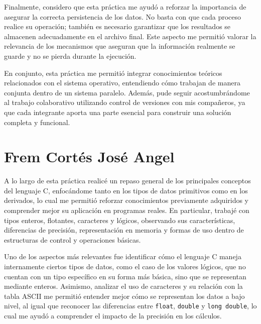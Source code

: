 Finalmente, considero que esta práctica me ayudó a reforzar la importancia de asegurar la correcta persistencia de los datos. No basta con que cada proceso realice su operación; también es necesario garantizar que los resultados se almacenen adecuadamente en el archivo final. Este aspecto me permitió valorar la relevancia de los mecanismos que aseguran que la información realmente se guarde y no se pierda durante la ejecución.

En conjunto, esta práctica me permitió integrar conocimientos teóricos relacionados con el sistema operativo, entendiendo cómo trabajan de manera conjunta dentro de un sistema paralelo. Además, pude seguir acostumbrándome al trabajo colaborativo utilizando control de versiones con mis compañeros, ya que cada integrante aporta una parte esencial para construir una solución completa y funcional.

\newpage
\section{Frem Cortés José Angel}

A lo largo de esta práctica realicé un repaso general de los principales conceptos del lenguaje C, enfocándome tanto en los tipos de datos primitivos como en los derivados, lo cual me permitió reforzar conocimientos previamente adquiridos y comprender mejor su aplicación en programas reales. En particular, trabajé con tipos enteros, flotantes, caracteres y lógicos, observando sus características, diferencias de precisión, representación en memoria y formas de uso dentro de estructuras de control y operaciones básicas.

Uno de los aspectos más relevantes fue identificar cómo el lenguaje C maneja internamente ciertos tipos de datos, como el caso de los valores lógicos, que no cuentan con un tipo específico en su forma más básica, sino que se representan mediante enteros. Asimismo, analizar el uso de caracteres y su relación con la tabla ASCII me permitió entender mejor cómo se representan los datos a bajo nivel, al igual que reconocer las diferencias entre \texttt{float}, \texttt{double} y \texttt{long double}, lo cual me ayudó a comprender el impacto de la precisión en los cálculos.

